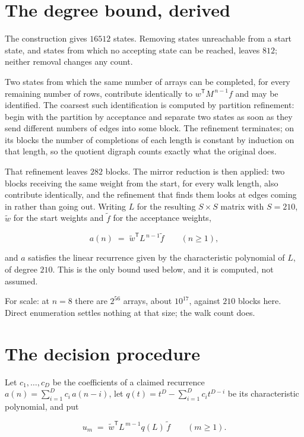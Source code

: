 \documentclass[11pt]{article}
\theoremstyle{definition}
\begin{document}
\section{The degree bound, derived}

The construction gives $16512$ states. Removing states unreachable from a start state, and states from which no accepting state can be reached, leaves $812$; neither removal changes any count.

Two states from which the same number of arrays can be completed, for every remaining number of rows, contribute identically to $w^{\mathsf T}M^{\,n-1}f$ and may be identified. The coarsest such identification is computed by partition refinement: begin with the partition by acceptance and separate two states as soon as they send different numbers of edges into some block. The refinement terminates; on its blocks the number of completions of each length is constant by induction on that length, so the quotient digraph counts exactly what the original does.

That refinement leaves $282$ blocks. The mirror reduction is then applied: two blocks receiving the same weight from the start, for every walk length, also contribute identically, and the refinement that finds them looks at edges coming in rather than going out. Writing $L$ for the resulting $S \times S$ matrix with $S = 210$, $\tilde w$ for the start weights and $\tilde f$ for the acceptance weights,

\[a(n) \;=\; \tilde w^{\mathsf T} L^{\,n-1} \tilde f \qquad (n \ge 1),\]

and $a$ satisfies the linear recurrence given by the characteristic polynomial of $L$, of degree $210$. This is the only bound used below, and it is computed, not assumed.

For scale: at $n = 8$ there are $2^{56}$ arrays, about $10^{17}$, against $210$ blocks here. Direct enumeration settles nothing at that size; the walk count does.

\section{The decision procedure}

Let $c_1,\dots,c_D$ be the coefficients of a claimed recurrence $a(n) = \sum_{i=1}^{D} c_i\,a(n-i)$, let $q(t) = t^{D} - \sum_{i=1}^{D} c_i t^{D-i}$ be its characteristic polynomial, and put

\[u_m \;=\; \tilde w^{\mathsf T} L^{\,m-1} q(L)\,\tilde f \qquad (m \ge 1).\]
\end{document}
